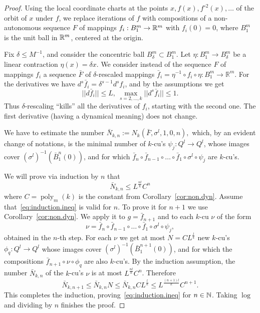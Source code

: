 \documentclass[reqno]{amsart}
\renewcommand\~[1]{\widetilde{#1}}
\def\poly{\operatorname{poly}} \def\J{\operatorname{J}}
\begin{document}
\begin{proof}
  Using the local coordinate charts at the points
  $x,f(x),f^{\circ 2}(x),\ldots$ of the orbit of $x$ under $f$, we
  replace iterations of $f$ with compositions of a non-autonomous
  sequence $F$ of mappings $f_i:B^m_1\to{\mathbb R}^m$ with $f_i(0)=0$, where
  $B^m_1$ is the unit ball in ${\mathbb R}^m$, centered at the origin.

  Fix $\delta\le M^{-1}$, and consider the concentric ball
  $B^m_\delta\subset B^m_1.$ Let $\eta: B^m_1\to B^m_\delta$ be a
  linear contraction $\eta(x)=\delta x$. We consider instead of the
  sequence $F$ of mappings $f_i$ a sequence $\bar F$ of
  $\delta$-rescaled mappings
  $\bar f_i=\eta^{-1}\circ f_i\circ \eta:B^m_1\to {\mathbb R}^m.$ For
  the derivatives we have $d^s\bar f_i=\delta^{s-1}d^s f_i$, and by
  the assumptions we get
  \begin{equation}
    ||d\bar f_i||\le L, \ \max_{s=2,\ldots,k}||d^s \bar f_i||\le 1.
  \end{equation}
  Thus $\delta$-rescaling ``kills'' all the derivatives of $f_i$,
  starting with the second one. The first derivative (having a
  dynamical meaning) does not change.

  We have to estimate the number
  $\bar N_{k,n}:=N_k(\bar F,\sigma^l,1,0,n),$ which, by an evident
  change of notations, is the minimal number of $k$-cu's
  $\psi_j:Q^l\to Q^l$, whose images cover
  $(\sigma^l)^{-1}(\bar B^n_{1}(0))$, and for which
  $\bar f_n\circ \bar f_{n-1}\circ \ldots \circ \bar f_1 \circ \sigma^l \circ \psi_j$
  are $k$-cu's.

  We will prove via induction by $n$ that
  \begin{equation}\label{eq:induction.ineq}
    \bar N_{k,n}\leq L^{\frac{nl}{k}}C^n
  \end{equation}
  where $C=\poly_m(k)$ is the constant from
  Corollary~\ref{cor:non.dyn}.  Assume that~\eqref{eq:induction.ineq}
  is valid for $n$. To prove it for $n+1$ we use
  Corollary~\ref{cor:non.dyn}.  We apply it to $g=\bar f_{n+1}$ and to
  each $k$-cu $\nu$ of the form
  \begin{equation}
    \nu=\bar f_n\circ \bar f_{n-1}\circ \ldots \circ \bar f_1 \circ \sigma^l \circ \psi_j,
  \end{equation}
  obtained in the $n$-th step. For each $\nu$ we get at most
  $N=CL^{\frac{l}{k}}$ new $k$-cu's $\phi_q: Q^l\to Q^l$ whose images
  cover $(\sigma^l)^{-1}(\bar B^{n+1}_{1}(0))$, and for which the
  compositions $\bar f_{n+1}\circ \nu\circ \phi_q$ are also
  $k$-cu's. By the induction assumption, the number $\bar N_{k,n}$ of
  the $k$-cu's $\nu$ is at most $L^{\frac{nl}{k}}C^n$. Therefore
  \begin{equation}
    \bar N_{k,n+1}\le \bar N_{k,n}N\le \bar N_{k,n}CL^{\frac{l}{k}}\le L^{\frac{(n+1)l}{k}}C^{n+1}.  
  \end{equation}
  This completes the induction, proving~\eqref{eq:induction.ineq} for
  $n\in{\mathbb N}$. Taking $\log$ and dividing by $n$ finishes the proof.
\end{proof}
\end{document}
